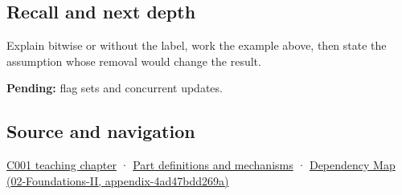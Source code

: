\subsection{Recall and next depth}\label{recall-and-next-depth}

Explain bitwise or without the label, work the example above, then state the assumption whose removal would change the result.

\textbf{Pending:} flag sets and concurrent updates.

\subsection{Source and navigation}\label{source-and-navigation}

\href{Continuous\%20Notes/Computing\%20Foundations\%20-\%20From\%20Bits\%20to\%20C++\%20and\%20Systems\%20APIs\#From\%20a\%20signal\%20to\%20an\%20interpretation}{C001 teaching chapter} · \hyperref[appendix-fd090d982a15]{Part definitions and mechanisms} · \href{}{Dependency Map (02-Foundations-II, appendix-4ad47bdd269a)}
